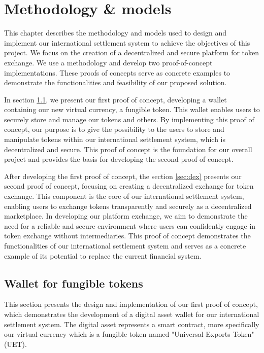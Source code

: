 \chapter{Methodology \& models}
\label{ch:methodology}

This chapter describes the methodology and models used to design and implement our international settlement system to achieve
the objectives of this project. We focus on the creation of a decentralized and secure platform for token exchange. We use a methodology
and develop two proof-of-concept implementations. These proofs of concepts serve as concrete examples to demonstrate the functionalities and
feasibility of our proposed solution.


In section \ref{sec:wallet_fungible_tokens}, we present our first proof of concept, developing a wallet containing our new virtual currency, a fungible token.
This wallet enables users to securely store and manage our tokens and others. By implementing this proof of concept, our purpose is to give the possibility
to the users to store and manipulate tokens within our international settlement system, which is decentralized and secure.
This proof of concept is the foundation for our overall project and provides the basis for developing the second proof of concept.

After developing the first proof of concept, the section \ref{sec:dex} presents our second proof of concept, focusing on creating
a decentralized exchange for token exchange.  This component is the core of our international settlement system, enabling users to
exchange tokens transparently and securely as a decentralized marketplace. In developing our platform exchange, we aim to
demonstrate the need for a reliable and secure environment where users can confidently engage in token exchange without
intermediaries. This proof of concept demonstrates the functionalities of our international settlement system and serves as a concrete example
of its potential to replace the current financial system.


\section{Wallet for fungible tokens}
\label{sec:wallet_fungible_tokens}



This section presents the design and implementation of our first proof of concept, which demonstrates the development of a digital asset wallet
for our international settlement system. The digital asset represents a smart contract, more specifically our virtual currency which is a fungible
token named "Universal Exports Token" (UET).



